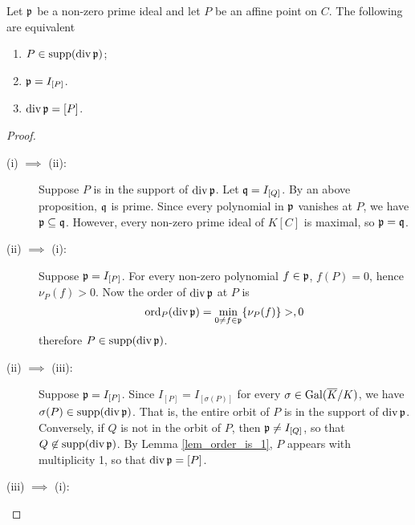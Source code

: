 \begin{proposition}
  Let $\frak p$ be a non-zero prime ideal and let $P$ be an affine point on $C$.
  The following are equivalent
  \begin{enumerate}[label=(\roman*)]
    \item $P \in \supp(\div \frak p)$;
    \item $\frak p = I_{[P]}$.
    \item $\div \frak p = [P]$.
  \end{enumerate}
\end{proposition}
\begin{proof}
  \begin{description}
    \item [(i) $\implies$ (ii):]
      Suppose $P$ is in the support of $\div \frak p$.
      Let $\frak q = I_{[Q]}$.
      By an above proposition, $\frak q$ is prime.
      Since every polynomial in $\frak p$ vanishes at $P$, we have $\frak p \subseteq \frak q$.
      However, every non-zero prime ideal of $K[C]$ is maximal, so $\frak p = \frak q$.

    \item [(ii) $\implies$ (i):]
      Suppose $\frak p = I_{[P]}$.
      For every non-zero polynomial $f \in \frak p$, $f(P) = 0$, hence $\nu_P(f) > 0$.
      Now the order of $\div \frak p$ at $P$ is
      \[ \ord_P(\div \frak p) = \min_{0 \neq f \in \frak p}\{ \nu_P(f) \} > ,0 \]
      therefore $P \in \supp(\div \frak p)$.

    \item [(ii) $\implies$ (iii):]
      Suppose $\frak p = I_{[P]}$.
      Since $I_{[P]} = I_{[\sigma(P)]}$ for every $\sigma \in \Gal(\bar K/K)$,
      we have $\sigma(P) \in \supp(\div \frak p)$.
      That is, the entire orbit of $P$ is in the support of $\div \frak p$.
      Conversely, if $Q$ is not in the orbit of $P$, then $\frak p \neq I_{[Q]}$,
      so that $Q \not \in \supp(\div \frak p)$.
      By Lemma \ref{lem_order_is_1}, $P$ appears with multiplicity 1, so that $\div \frak p = [P]$.
      
    \item [(iii) $\implies$ (i):]
  \end{description}
\end{proof}

